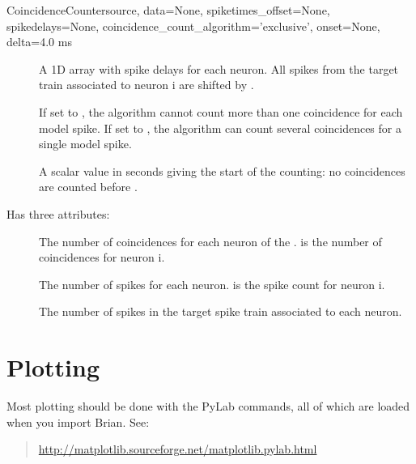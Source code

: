 \documentclass[letterpaper,10pt,english]{manual}
\begin{document}
\begin{classdesc}{CoincidenceCounter}{source, data=None, spiketimes\_offset=None, spikedelays=None, coincidence\_count\_algorithm='exclusive', onset=None, delta=4.0 ms}
\begin{description}
\item[] \leavevmode
A 1D array with spike delays for each neuron. All spikes from the target 
train associated to neuron i are shifted by .

\item[] \leavevmode
If set to , the algorithm cannot count more than one
coincidence for each model spike.
If set to , the algorithm can count several coincidences
for a single model spike.

\item[] \leavevmode
A scalar value in seconds giving the start of the counting: no
coincidences are counted before .

\end{description}

Has three attributes:
\begin{description}
\item[] \leavevmode
The number of coincidences for each neuron of the \hyperlink{brian.NeuronGroup}{}.
 is the number of coincidences for neuron i.

\item[] \leavevmode
The number of spikes for each neuron.  is the spike
count for neuron i.

\item[] \leavevmode
The number of spikes in the target spike train associated to each neuron.

\end{description}
\end{classdesc}

\resetcurrentobjects
\hypertarget{--doc-reference-plotting}{}

\hypertarget{index-104}{}\section{Plotting}
Most plotting should be done with the PyLab commands, all of
which are loaded when you import Brian. See:
\begin{quote}

\href{http://matplotlib.sourceforge.net/matplotlib.pylab.html}{http://matplotlib.sourceforge.net/matplotlib.pylab.html}
\end{quote}
\end{document}
